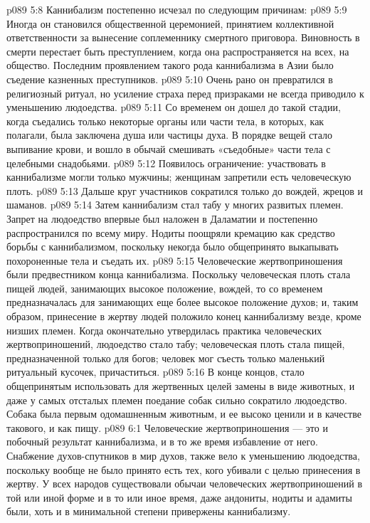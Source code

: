 \vs p089 5:8 \pc Каннибализм постепенно исчезал по следующим причинам:
\vs p089 5:9 \bibnobreakspace Иногда он становился общественной церемонией, принятием коллективной ответственности за вынесение соплеменнику смертного приговора. Виновность в смерти перестает быть преступлением, когда она распространяется на всех, на общество. Последним проявлением такого рода каннибализма в Азии было съедение казненных преступников.
\vs p089 5:10 \pc {}\bibnobreakspace Очень рано он превратился в религиозный ритуал, но усиление страха перед призраками не всегда приводило к уменьшению людоедства.
\vs p089 5:11 \pc {}\bibnobreakspace Со временем он дошел до такой стадии, когда съедались только некоторые органы или части тела, в которых, как полагали, была заключена душа или частицы духа. В порядке вещей стало выпивание крови, и вошло в обычай смешивать «съедобные» части тела с целебными снадобьями.
\vs p089 5:12 \pc {}\bibnobreakspace Появилось ограничение: участвовать в каннибализме могли только мужчины; женщинам запретили есть человеческую плоть.
\vs p089 5:13 \pc {}\bibnobreakspace Дальше круг участников сократился только до вождей, жрецов и шаманов.
\vs p089 5:14 \pc {}\bibnobreakspace Затем каннибализм стал табу у многих развитых племен. Запрет на людоедство впервые был наложен в Даламатии и постепенно распространился по всему миру. Нодиты поощряли кремацию как средство борьбы с каннибализмом, поскольку некогда было общепринято выкапывать похороненные тела и съедать их.
\vs p089 5:15 \pc {}\bibnobreakspace Человеческие жертвоприношения были предвестником конца каннибализма. Поскольку человеческая плоть стала пищей людей, занимающих высокое положение, вождей, то со временем предназначалась для занимающих еще более высокое положение духов; и, таким образом, принесение в жертву людей положило конец каннибализму везде, кроме низших племен. Когда окончательно утвердилась практика человеческих жертвоприношений, людоедство стало табу; человеческая плоть стала пищей, предназначенной только для богов; человек мог съесть только маленький ритуальный кусочек, причаститься.
\vs p089 5:16 \pc В конце концов, стало общепринятым использовать для жертвенных целей замены в виде животных, и даже у самых отсталых племен поедание собак сильно сократило людоедство. Собака была первым одомашненным животным, и ее высоко ценили и в качестве такового, и как пищу.
\vs p089 6:1 Человеческие жертвоприношения --- это и побочный результат каннибализма, и в то же время избавление от него. Снабжение духов\hyp{}спутников в мир духов, также вело к уменьшению людоедства, поскольку вообще не было принято есть тех, кого убивали с целью принесения в жертву. У всех народов существовали обычаи человеческих жертвоприношений в той или иной форме и в то или иное время, даже андониты, нодиты и адамиты были, хоть и в минимальной степени привержены каннибализму.
